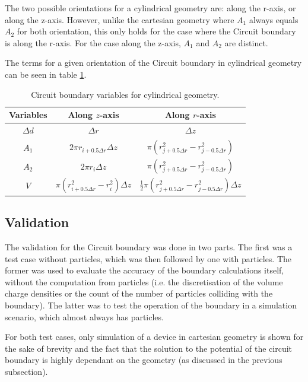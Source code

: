 The two possible orientations for a cylindrical geometry are: along the r-axis, or along the z-axis. However, unlike the cartesian geometry where $A_1$ always equals $A_2$ for both orientation, this only holds for the case where the Circuit boundary is along the r-axis. For the case along the z-axis, $A_1$ and $A_2$ are distinct. 

The terms for a given orientation of the Circuit boundary in cylindrical geometry can be seen in table \ref{tb:variables_cylindrical_geometry}.

\begin{table}[h!]
	\caption{Circuit boundary variables for cylindrical geometry.}
	\vspace{5 pt}
	\centering
	\begin{tabular}{c c c}
		Variables  & Along $z$-axis      		   & Along $r$-axis       \\
		\hline 
		$\Delta d$        & $\Delta r$           		   & $\Delta z$           \\
		$A_1$      & $2\pi r_{i + 0.5\Delta r} \Delta z$  		   & $\pi (r_{j + 0.5\Delta r}^2 - r_{j - 0.5\Delta r}^2)$  \\
		$A_2$      & $2\pi r_i \Delta z$           & $\pi (r_{j + 0.5\Delta r}^2 - r_{j - 0.5\Delta r}^2)$  \\
		$V$        & $\pi (r_{i + 0.5\Delta r}^2 - r_i^2)\Delta z$  & $\frac{1}{2} \pi (r_{j + 0.5\Delta r}^2 - r_{j - 0.5\Delta r}^2)\Delta z$
	\end{tabular}
	\label{tb:variables_cylindrical_geometry}
\end{table}

\subsection{Validation}

The validation for the Circuit boundary was done in two parts. The first was a test case without particles, which was then followed by one with particles. The former was used to evaluate the accuracy of the boundary calculations itself, without the computation from particles (i.e. the discretisation of the volume charge densities or the count of the number of particles colliding with the boundary). The latter was to test the operation of the boundary in a simulation scenario, which almost always has particles.

For both test cases, only simulation of a device in cartesian geometry is shown for the sake of brevity and the fact that the solution to the potential of the circuit boundary is highly dependant on the geometry (as discussed in the previous subsection). 

